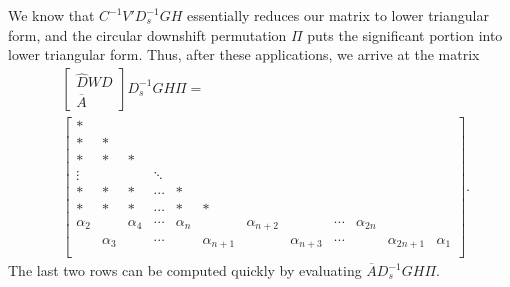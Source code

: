 We know that $C^{-1}V'D_{s}^{-1}GH$ essentially reduces our matrix to
lower triangular form, and the circular downshift permutation $\Pi$ 
puts the significant portion into lower triangular form.
Thus, after these applications, we arrive at the matrix
%
\begin{align}
    &\begin{bmatrix} \widehat{D}WD \\ \overline{A} \end{bmatrix}D_{s}^{-1}GH\Pi
        = \nonumber\\
    &\begin{bmatrix}
            * & \\
            * & * & \\
            * & * & * & \\
            \vdots &   &   & \ddots \\
            * & * & * & \cdots & * & \\
            * & * & * & \cdots & * & * & \\
            \alpha_{2} & & \alpha_{4} & \cdots & \alpha_{n} & &
                \alpha_{n+2} & & \cdots & \alpha_{2n} & & \\
            & \alpha_{3} & & \cdots & & \alpha_{n+1} &
                & \alpha_{n+3} & \cdots & & \alpha_{2n+1} & \alpha_{1} \\
            \end{bmatrix}.
\end{align}
%
The last two rows can be computed quickly by evaluating
$\overline{A}D_{s}^{-1}GH\Pi$.

